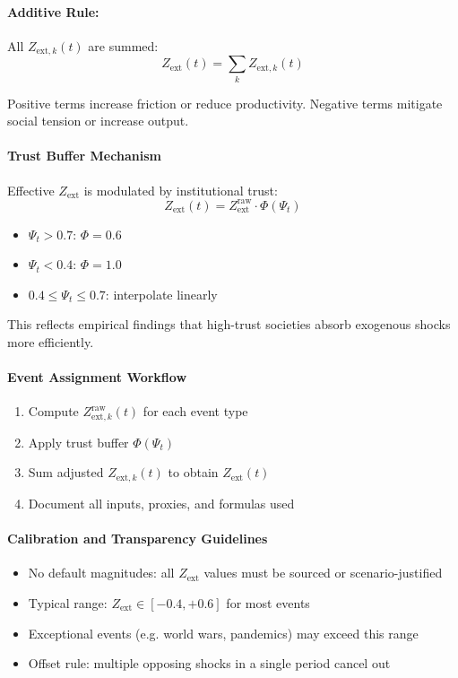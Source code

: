 \documentclass[12pt]{report}
\begin{document}
\paragraph{Additive Rule:}
All $Z_{\text{ext},k}(t)$ are summed:
\[
Z_{\text{ext}}(t) = \sum_k Z_{\text{ext},k}(t)
\]

Positive terms increase friction or reduce productivity. Negative terms mitigate social tension or increase output.

\paragraph{Trust Buffer Mechanism}

Effective $Z_{\text{ext}}$ is modulated by institutional trust:
\[
Z_{\text{ext}}(t) = Z_{\text{ext}}^{\text{raw}} \cdot \Phi(\Psi_t)
\]

\begin{itemize}
  \item $\Psi_t > 0.7$: $\Phi = 0.6$
  \item $\Psi_t < 0.4$: $\Phi = 1.0$
  \item $0.4 \leq \Psi_t \leq 0.7$: interpolate linearly
\end{itemize}

This reflects empirical findings that high-trust societies absorb exogenous shocks more efficiently.

\paragraph{Event Assignment Workflow}

\begin{enumerate}
  \item Compute $Z_{\text{ext},k}^{\text{raw}}(t)$ for each event type
  \item Apply trust buffer $\Phi(\Psi_t)$
  \item Sum adjusted $Z_{\text{ext},k}(t)$ to obtain $Z_{\text{ext}}(t)$
  \item Document all inputs, proxies, and formulas used
\end{enumerate}

\paragraph{Calibration and Transparency Guidelines}
\begin{itemize}
  \item No default magnitudes: all $Z_{\text{ext}}$ values must be sourced or scenario-justified
  \item Typical range: $Z_{\text{ext}} \in [-0.4, +0.6]$ for most events
  \item Exceptional events (e.g. world wars, pandemics) may exceed this range
  \item Offset rule: multiple opposing shocks in a single period cancel out
\end{itemize}
\end{document}
